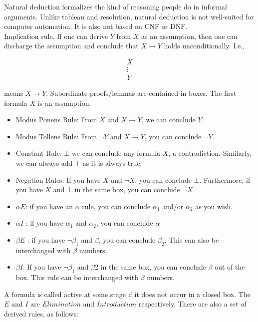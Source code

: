 \documentclass[a4paper]{article}
\theoremstyle{plain}
\theoremstyle{definition}
\newtheorem{defn}{Definition}[section]
\theoremstyle{remark}
\begin{document}
\begin{tcolorbox}[colback=black!3!white,colframe=black!60!white,title=\begin{defn}Natural Deduction \label{Natural Deduction}\end{defn}]
Natural deduction formalizes the kind of reasoning people do in informal arguments. Unlike tableau and resolution, natural deduction is not well-suited for computer automation. It is also not based on CNF or DNF. \\
Implication rule. If one can derive $Y$ from $X$ as an assumption, then one can discharge the assumption and conclude that $X\to Y$ holds unconditionally. I.e.,
\begin{tcolorbox}[minipage,colback=white,arc=0pt,outer arc=0pt]
\centering
\begin{align*}
	X\\
	\vdots\\
	Y
\end{align*}
\end{tcolorbox}
means $X \to Y$. Subordinate proofs/lemmas are contained in boxes. The first formula $X$ is an assumption.
\begin{itemize}
	\item Modus Ponens Rule: From $X$ and $X\to Y$, we can conclude $Y$.
	\item Modus Tollens Rule: From $\neg Y$ and $X \to Y$, you can conclude $\neg Y$.
	\item Constant Rule: $\bot$ we can conclude any formula $X$, a contradiction. Similarly, we can always add $\top$ as it is always true.
	\item Negation Rules: If you have $X$ and $\neg X$, you can conclude $\bot$. Furthermore, if you have $X$ and $\bot$ in the same box, you can conclude $\neg X$.
	\item $\alpha E$: if you have an $\alpha$ rule, you can conclude $\alpha_1$ and/or $\alpha_2$ as you wish.
	\item $\alpha I$ : if you have $\alpha_1$ and $\alpha_2$, you can conclude $\alpha$ 
	\item $\beta E$ : if you have $\neg \beta_1$ and $ \beta$, you can conclude $\beta_2$. This can also be interchanged with $\beta$ numbers.
	\item $\beta I$: If you have $\neg \beta_1$ and $\beta 2$ in the same box, you can conclude $\beta$ out of the box. This rule can be interchanged with $\beta$ numbers.
\end{itemize}
A formula is called active at some stage if it does not occur in a closed box. The $E$ and $I$ are $Elimination$ and $Introduction$ respectively. There are also a set of derived rules, as follows:

\end{tcolorbox}
\end{document}
